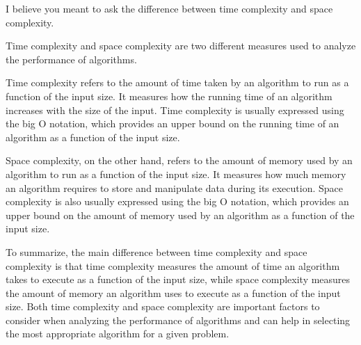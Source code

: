 I believe you meant to ask the difference between time complexity and space complexity.

Time complexity and space complexity are two different measures used to analyze the performance of algorithms. 

Time complexity refers to the amount of time taken by an algorithm to run as a function of the input size. It measures how the running time of an algorithm increases with the size of the input. Time complexity is usually expressed using the big O notation, which provides an upper bound on the running time of an algorithm as a function of the input size.

Space complexity, on the other hand, refers to the amount of memory used by an algorithm to run as a function of the input size. It measures how much memory an algorithm requires to store and manipulate data during its execution. Space complexity is also usually expressed using the big O notation, which provides an upper bound on the amount of memory used by an algorithm as a function of the input size.

To summarize, the main difference between time complexity and space complexity is that time complexity measures the amount of time an algorithm takes to execute as a function of the input size, while space complexity measures the amount of memory an algorithm uses to execute as a function of the input size. Both time complexity and space complexity are important factors to consider when analyzing the performance of algorithms and can help in selecting the most appropriate algorithm for a given problem.
